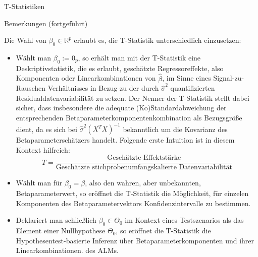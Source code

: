 \documentclass[
  8pt,
  ignorenonframetext,
]{beamer}
\begin{document}
\begin{frame}{T-Statistiken}
\protect\hypertarget{t-statistiken-1}{}
\footnotesize

Bemerkungen (fortgeführt)

Die Wahl von \(\beta_0 \in \mathbb{R}^p\) erlaubt es, die T-Statistik
unterschiedlich einzusetzen:

\begin{itemize}
\item
  \justifying Wählt man \(\beta_0 := 0_p\), so erhält man mit der
  T-Statistik eine Deskriptivstatistik, die es erlaubt, geschätzte
  Regressoreffekte, also Komponenten oder Linearkombinationen von
  \(\hat{\beta}\), im Sinne eines Signal-zu-Rauschen Verhältnisses in
  Bezug zu der durch \(\hat{\sigma}^2\) quantifizierten
  Residualdatenvariabilität zu setzen. Der Nenner der T-Statistik stellt
  dabei sicher, dass insbesondere die adequate (Ko)Standardabweichung
  der entsprechenden Betaparameterkomponentenkombination als Bezugsgröße
  dient, da es sich bei \(\hat{\sigma}^2\left(X^TX\right)^{-1}\)
  bekanntlich um die Kovarianz des Betaparameterschätzers handelt.
  Folgende erste Intuition ist in diesem Kontext hilfreich:
  \begin{equation}
  T = \frac{\mbox{Geschätzte Effektstärke}}{\mbox{Geschätzte stichprobenumfangskalierte Datenvariabilität}}
  \end{equation}
\item
  \justifying Wählt man für \(\beta_0 = \beta\), also den wahren, aber
  unbekannten, Betaparameterwert, so eröffnet die T-Statistik die
  Möglichkeit, für einzelen Komponenten des Betaparametervektors
  Konfidenzintervalle zu bestimmen.
\item
  \justifying Deklariert man schließlich \(\beta_0 \in \Theta_0\) im
  Kontext eines Testszenarios als das Element einer Nullhypothese
  \(\Theta_0\), so eröffnet die T-Statistik die Hypothesentest-basierte
  Inferenz über Betaparameterkomponenten und ihrer Linearkombinationen.
  des ALMs.
\end{itemize}
\end{frame}
\end{document}
